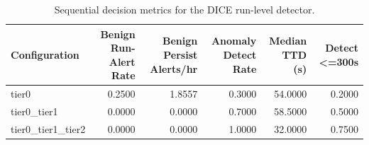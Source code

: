 \begin{table}[t]
\centering
\caption{Sequential decision metrics for the DICE run-level detector.}
\label{tab:dice_sequential_metrics}
\footnotesize
\begin{tabular}{lrrrrr}
\toprule
Configuration & Benign Run-Alert Rate & Benign Persist Alerts/hr & Anomaly Detect Rate & Median TTD (s) & Detect <=300s \\
\midrule
tier0 & 0.2500 & 1.8557 & 0.3000 & 54.0000 & 0.2000 \\
tier0_tier1 & 0.0000 & 0.0000 & 0.7000 & 58.5000 & 0.5000 \\
tier0_tier1_tier2 & 0.0000 & 0.0000 & 1.0000 & 32.0000 & 0.7500 \\
\bottomrule
\end{tabular}

\end{table}
